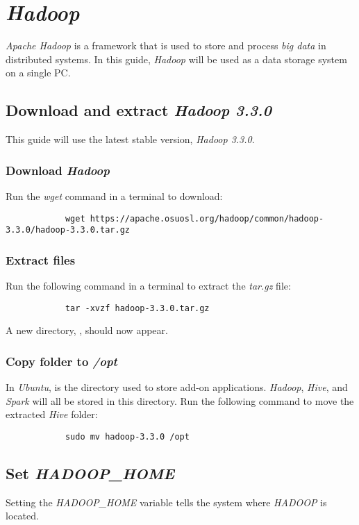 \documentclass{article}
\begin{document}
\section{\emph{Hadoop}}
\emph{Apache Hadoop} is a framework that is used to store and process \emph{big data} in distributed systems.
In this guide, \emph{Hadoop} will be used as a data storage system on a single PC.

    \subsection{Download and extract \emph{Hadoop 3.3.0}}
    This guide will use the latest stable version, \emph{Hadoop 3.3.0}.
    
        \subsubsection{Download \emph{Hadoop}}
        Run the \emph{wget} command in a terminal to download:
        \begin{verbatim}
            wget https://apache.osuosl.org/hadoop/common/hadoop-3.3.0/hadoop-3.3.0.tar.gz
        \end{verbatim}

        \subsubsection{Extract files}
        Run the following command in a terminal to extract the \emph{tar.gz} file:
        \begin{verbatim}
            tar -xvzf hadoop-3.3.0.tar.gz
        \end{verbatim}
        A new directory, , should now appear.

        \subsubsection{Copy folder to \emph{/opt}}
        In \emph{Ubuntu},  is the directory used to store add-on applications. \emph{Hadoop},
        \emph{Hive}, and \emph{Spark} will all be stored in this directory. Run the following command to
        move the extracted \emph{Hive} folder:
        \begin{verbatim}
            sudo mv hadoop-3.3.0 /opt
        \end{verbatim}
    
    \subsection{Set \emph{HADOOP\_HOME}}
    Setting the \emph{HADOOP\_HOME} variable tells the system where \emph{HADOOP} is located.
\end{document}
